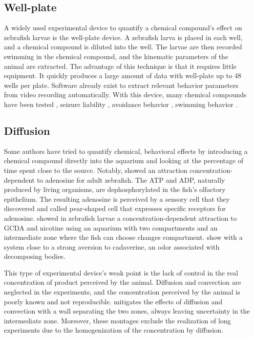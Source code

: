     \subsection{Well-plate}
    A widely used experimental device to quantify a chemical compound's effect on zebrafish larvae is the well-plate device. A zebrafish larva is placed in each well, and a chemical compound is diluted into the well. The larvae are then recorded swimming in the chemical compound, and the kinematic parameters of the animal are extracted. The advantage of this technique is that it requires little equipment. It quickly produces a large amount of data with well-plate up to 48 wells per plate. Software already exist to extract relevant behavior parameters from video recording automatically. With this device, many chemical compounds have been tested \cite{sallinen2009mptp,rihel2010zebrafish,kokel2010rapid}, seizure liability \cite{winter2008validation}, avoidance behavior \cite{pelkowski2011novel}, swimming behavior \cite{farrell2011evaluation}.

    \subsection{Diffusion}
    Some authors have tried to quantify chemical, behavioral effects by introducing a chemical compound directly into the aquarium and looking at the percentage of time spent close to the source. Notably, \cite{wakisaka2017adenosine} showed an attraction concentration-dependent to adenosine for adult zebrafish. The ATP and ADP, naturally produced by living organisms, are dephosphorylated in the fish's olfactory epithelium. The resulting adenosine is perceived by a sensory cell that they discovered and called pear-shaped cell that expresses specific receptors for adenosine. \cite{krishnan2014right} showed in zebrafish larvae a concentration-dependent attraction to GCDA and nicotine using an aquarium with two compartments and an intermediate zone where the fish can choose changes compartment. \cite{hussain2013high} show with a system close to \cite{krishnan2014right} a strong aversion to cadaverine, an odor associated with decomposing bodies.

    This type of experimental device's weak point is the lack of control in the real concentration of product perceived by the animal. Diffusion and convection are neglected in the experiments, and the concentration perceived by the animal is poorly known and not reproducible. \cite{hussain2013high,krishnan2014right} mitigates the effects of diffusion and convection with a wall separating the two zones, always leaving uncertainty in the intermediate zone. Moreover, these montages exclude the realization of long experiments due to the homogenization of the concentration by diffusion.

